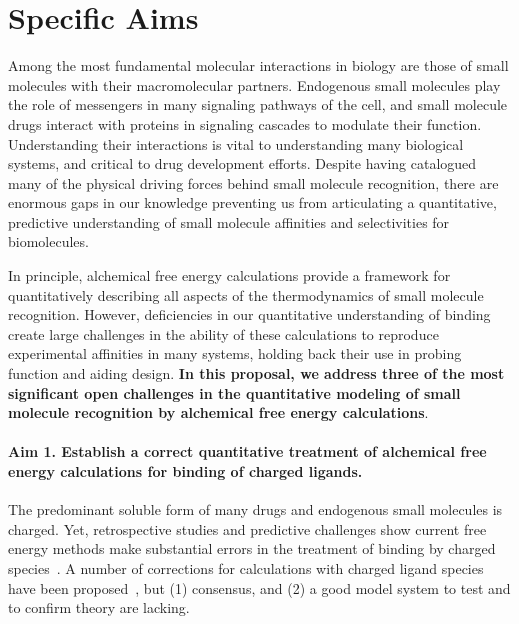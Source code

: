 \documentclass[10pt,final]{article}
\date{}
\begin{document}
\newpage
\section*{\centering Specific Aims}
Among the most fundamental molecular interactions in biology are those of small molecules with their macromolecular partners.
%
Endogenous small molecules play the role of messengers in many signaling pathways of the cell, and small molecule drugs interact with proteins in signaling cascades to modulate their function.
%
Understanding their interactions is vital to understanding many biological systems, and critical to drug development efforts.
%
Despite having catalogued many of the physical driving forces behind small molecule recognition, there are enormous gaps in our knowledge preventing us from articulating a quantitative, predictive understanding of small molecule affinities and selectivities for biomolecules.

In principle, alchemical free energy calculations provide a framework for quantitatively describing all aspects of the thermodynamics of small molecule recognition. 
%
However, deficiencies in our quantitative understanding of binding create large challenges in the ability of these calculations to reproduce experimental affinities in many systems, holding back their use in probing function and aiding design.
%
\textbf{In this proposal, we address three of the most significant open challenges in the quantitative modeling of small molecule recognition by alchemical free energy calculations}.

\paragraph*{Aim 1. Establish a correct quantitative treatment of alchemical free energy calculations for binding of charged ligands.}
The predominant soluble form of many drugs and endogenous small molecules is charged.
%
Yet, retrospective studies and predictive challenges show current free energy methods make substantial errors in the treatment of binding by charged species~\autocite{Rocklin2013b,Muddana2014a}.
%
A number of corrections for calculations with charged ligand species have been proposed~\autocite{Reif2013a,Rocklin2013a, Lin2014a}, but (1) consensus, and (2) a good model system to test and to confirm theory are lacking.
\end{document}
